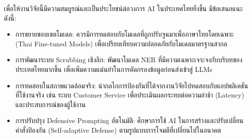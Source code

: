 เพื่อให้งานวิจัยนี้มีความสมบูรณ์และเป็นประโยชน์ต่อวงการ AI ในประเทศไทยยิ่งขึ้น มีข้อเสนอแนะดังนี้:
\begin{itemize}
    \item การขยายขอบเขตโมเดล: ควรมีการทดสอบกับโมเดลที่ถูกปรับจูนมาเพื่อภาษาไทยโดยเฉพาะ (Thai Fine-tuned Models) เพื่อเปรียบเทียบความปลอดภัยกับโมเดลมาตรฐานสากล
    \item การพัฒนาระบบ Scrubbing เชิงลึก: พัฒนาโมเดล NER ที่มีความเฉพาะเจาะจงกับบริบทของประเทศไทยมากขึ้น เพื่อเพิ่มความแม่นยำในการคัดกรองข้อมูลก่อนส่งเข้าสู่ LLMs
    \item การทดสอบในสภาพแวดล้อมจริง: นำกลไกการป้องกันที่ได้จากงานวิจัยไปทดสอบกับแอปพลิเคชันที่ใช้งานจริง เช่น ระบบ Customer Service เพื่อประเมินผลกระทบต่อความล่าช้า (Latency) และประสบการณ์ของผู้ใช้งาน
    \item การปรับปรุง Defensive Prompting อัตโนมัติ: ศึกษาการใช้ AI ในการสร้างและปรับเปลี่ยนคำสั่งป้องกัน (Self-adaptive Defense) ตามรูปแบบการโจมตีที่เปลี่ยนไปในอนาคต
\end{itemize}




